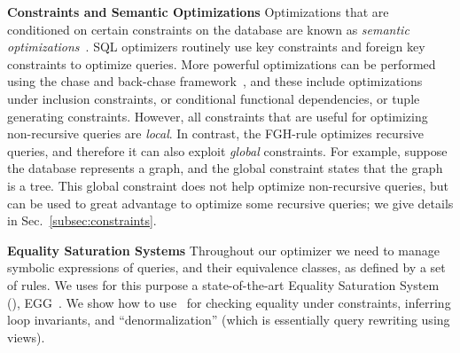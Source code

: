 {\bf Constraints and Semantic Optimizations} Optimizations that are
conditioned on certain constraints on the database are known as {\em
semantic optimizations}~\cite{DBLP:journals/debu/RamakrishnanS94}.
SQL optimizers routinely use key constraints and foreign key
constraints to optimize queries.  More powerful optimizations can
be performed using the chase and back-chase
framework~\cite{DBLP:conf/vldb/DeutschPT99,DBLP:conf/sigmod/PopaDST00},
and these include optimizations under inclusion constraints, or
conditional functional dependencies, or tuple generating constraints.
However, all constraints that are useful for optimizing non-recursive
queries are {\em local}.  In contrast, the FGH-rule optimizes
recursive queries, and therefore it can also exploit {\em global}
constraints.  For example, suppose the database represents a graph,
and the global constraint states that the graph is a tree.  This
global constraint does not help optimize non-recursive queries, but
can be used to great advantage to optimize some recursive queries; we
give details in Sec.~\ref{subsec:constraints}.

{\bf Equality Saturation Systems} Throughout our optimizer we need to
manage symbolic expressions of queries, and their equivalence classes,
as defined by a set of rules.  We uses for this purpose a
state-of-the-art Equality Saturation System (\eqsat),
EGG~\cite{DBLP:journals/pacmpl/WillseyNWFTP21}.  We show how to use
\eqsat\ for checking equality under constraints, inferring loop
invariants, and ``denormalization'' (which is essentially query
rewriting using views).







